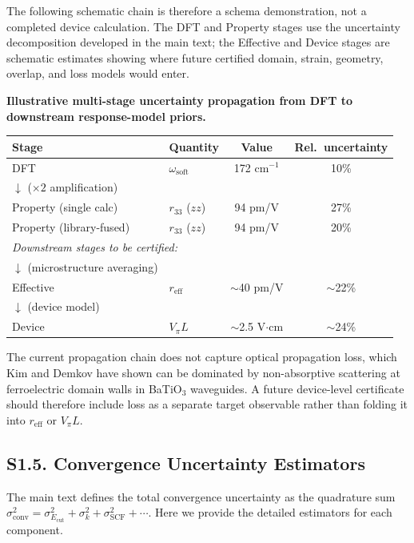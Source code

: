 ﻿\documentclass[prb,onecolumn,superscriptaddress,amsmath,amssymb,longbibliography]{revtex4-2}
\newcommand{\conv}{\mathrm{conv}}
\newcommand{\Ecut}{E_{\mathrm{cut}}}
\begin{document}
The following schematic chain is therefore a schema demonstration, not a
completed device calculation. The DFT and Property stages use the uncertainty
decomposition developed in the main text; the Effective and Device stages are
schematic estimates showing where future certified domain, strain, geometry,
overlap, and loss models would enter.

\begin{center}
\textbf{Illustrative multi-stage uncertainty propagation from DFT to
downstream response-model priors.}\\[0.5em]
\begin{tabular}{llcc}
\toprule
Stage & Quantity & Value & Rel.\ uncertainty \\
\midrule
DFT & $\omega_{\mathrm{soft}}$ & 172 cm$^{-1}$ & 10\% \\
$\downarrow$ ($\times 2$ amplification) & & & \\
Property (single calc) & $r_{33}$ ($zz$) & 94 pm/V & 27\% \\
Property (library-fused) & $r_{33}$ ($zz$) & 94 pm/V & 20\% \\
\midrule
\multicolumn{4}{l}{\textit{Downstream stages to be certified:}} \\
$\downarrow$ (microstructure averaging) & & & \\
Effective & $r_{\mathrm{eff}}$ & $\sim$40 pm/V & $\sim$22\% \\
$\downarrow$ (device model) & & & \\
Device & $V_\pi L$ & $\sim$2.5 V$\cdot$cm & $\sim$24\% \\
\bottomrule
\end{tabular}
\end{center}

The current propagation chain does not capture optical propagation loss, which
Kim and Demkov \cite{Kim2025_loss} have shown can be dominated by
non-absorptive scattering at ferroelectric domain walls in BaTiO$_3$
waveguides. A future device-level certificate should therefore include loss as
a separate target observable rather than folding it into $r_{\mathrm{eff}}$ or
$V_\pi L$.


\subsection{S1.5. Convergence Uncertainty Estimators}
\label{sec:si_convergence_est}

The main text defines the total convergence uncertainty as the quadrature sum
$\sigma_\conv^2 = \sigma_{\Ecut}^2 + \sigma_k^2 + \sigma_{\mathrm{SCF}}^2 +
\cdots$. Here we provide the detailed estimators for each component.
\end{document}
